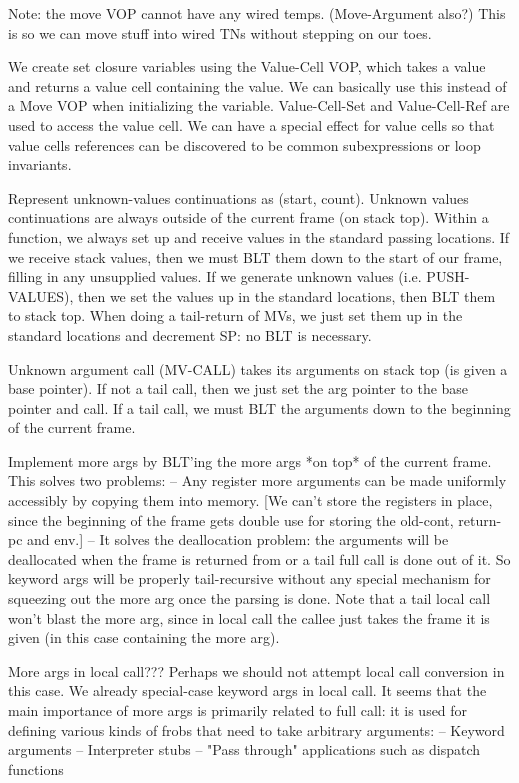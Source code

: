 Note: the move VOP cannot have any wired temps.  (Move-Argument also?)  This is
so we can move stuff into wired TNs without stepping on our toes.


We create set closure variables using the Value-Cell VOP, which takes a value
and returns a value cell containing the value.  We can basically use this
instead of a Move VOP when initializing the variable.  Value-Cell-Set and
Value-Cell-Ref are used to access the value cell.  We can have a special effect
for value cells so that value cells references can be discovered to be common
subexpressions or loop invariants.




Represent unknown-values continuations as (start, count).  Unknown values
continuations are always outside of the current frame (on stack top).  Within a
function, we always set up and receive values in the standard passing
locations.  If we receive stack values, then we must BLT them down to the start
of our frame, filling in any unsupplied values.  If we generate unknown values
(i.e. PUSH-VALUES), then we set the values up in the standard locations, then
BLT them to stack top.  When doing a tail-return of MVs, we just set them up in
the standard locations and decrement SP: no BLT is necessary.

Unknown argument call (MV-CALL) takes its arguments on stack top (is given a
base pointer).  If not a tail call, then we just set the arg pointer to the
base pointer and call.  If a tail call, we must BLT the arguments down to the
beginning of the current frame.


Implement more args by BLT'ing the more args *on top* of the current frame.
This solves two problems:
 -- Any register more arguments can be made uniformly accessibly by copying
    them into memory.  [We can't store the registers in place, since the
    beginning of the frame gets double use for storing the old-cont, return-pc
    and env.]
 -- It solves the deallocation problem: the arguments will be deallocated when
    the frame is returned from or a tail full call is done out of it.  So
    keyword args will be properly tail-recursive without any special mechanism
    for squeezing out the more arg once the parsing is done.  Note that a tail
    local call won't blast the more arg, since in local call the callee just
    takes the frame it is given (in this case containing the more arg).

More args in local call???  Perhaps we should not attempt local call conversion
in this case.  We already special-case keyword args in local call.  It seems
that the main importance of more args is primarily related to full call: it is
used for defining various kinds of frobs that need to take arbitrary arguments:
 -- Keyword arguments
 -- Interpreter stubs
 -- "Pass through" applications such as dispatch functions

